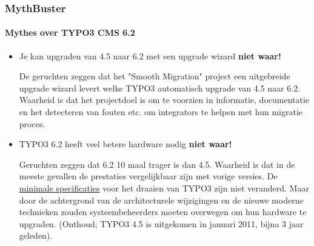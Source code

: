 \begin{frame}[fragile]
	\frametitle{MythBuster}
	\framesubtitle{Mythes over TYPO3 CMS 6.2}

	\begin{itemize}
		\item Je kan upgraden van 4.5 naar 6.2 met een upgrade wizard\newline
			\tabto{8.4cm}\color{red}\textbf{\textrightarrow niet waar!}\color{black}

			\smaller
				De geruchten zeggen dat het "Smooth Migration" project een uitgebreide upgrade wizard levert welke TYPO3 automatisch upgrade van 4.5 naar 6.2. Waarheid is dat het projectdoel is om te voorzien in informatie, documentatie en het detecteren van fouten etc. om integrators te helpen met hun migratie proces. 
			\normalsize

		\item TYPO3 6.2 heeft veel betere hardware nodig\newline
			\tabto{8.4cm}\color{red}\textbf{\textrightarrow niet waar!}\color{black}

			\smaller
				Geruchten zeggen dat 6.2 10 maal trager is dan 4.5. Waarheid is dat in de meeste gevallen de prestaties vergelijkbaar zijn met vorige versies. De \href{http://typo3.org/about/typo3-the-cms/system-requirements/}{minimale specificaties} voor het draaien van TYPO3 zijn niet veranderd. Maar door de achtergrond van de architecturele wijzigingen en de nieuwe moderne technieken zouden systeembeheerders moeten overwegen om hun hardware te upgraden. (Onthoud; TYPO3 4.5 is uitgekomen in januari 2011, bijna 3 jaar geleden).
			\normalsize

	\end{itemize}

\end{frame}


